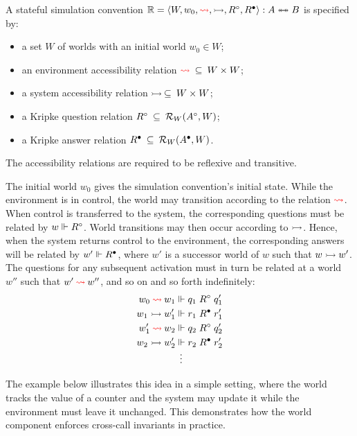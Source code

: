 \begin{definition}
  \label{def:oe:ssc}
  A stateful simulation convention
  $\mathbb{R} = \langle W, w_0, \textcolor{red}{\leadsto}, \rightarrowtail, R^\circ, R^\bullet \rangle : A \twoheadleftarrow \mathrel{\mkern-15mu} \twoheadrightarrow B$
  is specified by:
  \begin{itemize}
    \item a set $W$ of worlds with an initial world $w_0 \in W$;
    \item an environment accessibility relation $\textcolor{red}{\leadsto} \:\subseteq\: W \times W$;
    \item a system accessibility relation $\rightarrowtail \:\subseteq\: W \times W$;
    \item a Kripke question relation $R^\circ \:\subseteq\: \mathcal{R}_W(A^\circ, W)$;
    \item a Kripke answer relation $R^\bullet \:\subseteq\: \mathcal{R}_W(A^\bullet, W)$.
  \end{itemize}
  The accessibility relations are required to be reflexive and transitive.
\end{definition}

The initial world $w_0$ gives the simulation convention's initial state.
While the environment is in control,
the world may transition according to the relation $\textcolor{red}{\leadsto}$.
When control is transferred to the system,
the corresponding questions must be related by $w \Vdash R^\circ$.
World transitions may then occur according to $\rightarrowtail$.
Hence, when the system returns control to the environment,
the corresponding answers
will be related by $w' \Vdash R^\bullet$,
where $w'$ is a successor world of $w$ such that $w \rightarrowtail w'$.
The questions for any subsequent activation
must in turn be related at a world $w''$ such that $w' \mathbin{\textcolor{red}{\leadsto}} w''$,
and so on and so forth indefinitely:
\begin{align*}
  w_0 \mathbin{\textcolor{red}{\leadsto}} w_1 &\Vdash q_1 \mathrel{R^\circ} q'_1 \\
  w_1 \rightarrowtail w_1' &\Vdash r_1 \mathrel{R^\bullet} r'_1 \\
  w_1' \mathbin{\textcolor{red}{\leadsto}} w_2 &\Vdash q_2 \mathrel{R^\circ} q'_2 \\
  w_2 \rightarrowtail w_2' &\Vdash r_2 \mathrel{R^\bullet} r'_2 \\[-1ex]
  &\:\:\vdots
\end{align*}

The example below illustrates this idea
in a simple setting,
where the world tracks the value of a counter
and the system may update it
while the environment must leave it unchanged.
This demonstrates
how the world component
enforces cross-call invariants in practice.

